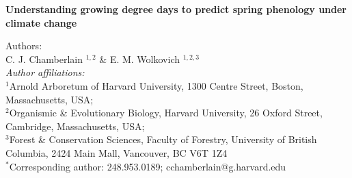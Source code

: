 \documentclass{article}\usepackage[]{graphicx}\usepackage[]{color}
\makeatletter
\newenvironment{kframe}{%
 \def\at@end@of@kframe{}%
 \ifinner\ifhmode%
  \def\at@end@of@kframe{\end{minipage}}%
  \begin{minipage}{\columnwidth}%
 \fi\fi%
 \def\FrameCommand##1{\hskip\@totalleftmargin \hskip-\fboxsep
 \colorbox{shadecolor}{##1}\hskip-\fboxsep
     \hskip-\linewidth \hskip-\@totalleftmargin \hskip\columnwidth}%
 \MakeFramed {\advance\hsize-\width
   \@totalleftmargin\z@ \linewidth\hsize
   \@setminipage}}%
 {\par\unskip\endMakeFramed%
 \at@end@of@kframe}
\makeatother
\begin{document}
\noindent\textbf{\Large{Understanding growing degree days to predict spring phenology under climate change}}

\noindent Authors:\\
C. J. Chamberlain $^{1,2}$ \& E. M. Wolkovich $^{1,2,3}$
\vspace{2ex}\\
\emph{Author affiliations:}\\
$^{1}$Arnold Arboretum of Harvard University, 1300 Centre Street, Boston, Massachusetts, USA; \\
$^{2}$Organismic \& Evolutionary Biology, Harvard University, 26 Oxford Street, Cambridge, Massachusetts, USA; \\
$^{3}$Forest \& Conservation Sciences, Faculty of Forestry, University of British Columbia, 2424 Main Mall, Vancouver, BC V6T 1Z4\\
\vspace{2ex}
$^*$Corresponding author: 248.953.0189; cchamberlain@g.harvard.edu\\

\renewcommand{\thetable}{\arabic{table}}
\renewcommand{\thefigure}{\arabic{figure}}
\renewcommand{\labelitemi}{$-$}

\begin{kframe}


{\ttfamily\noindent\bfseries{}}\end{kframe}
\end{document}
